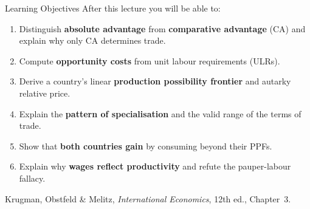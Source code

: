 \documentclass[aspectratio=169]{beamer}
\begin{document}
\begin{frame}{Learning Objectives}
After this lecture you will be able to:
\begin{enumerate}\small
  \item Distinguish \textbf{absolute advantage} from
        \textbf{comparative advantage} (CA) and explain why
        only CA determines trade.
  \item Compute \textbf{opportunity costs} from unit
        labour requirements (ULRs).
  \item Derive a country's linear \textbf{production
        possibility frontier} and autarky relative price.
  \item Explain the \textbf{pattern of specialisation}
        and the valid range of the terms of trade.
  \item Show that \textbf{both countries gain} by
        consuming beyond their PPFs.
  \item Explain why \textbf{wages reflect productivity}
        and refute the pauper-labour fallacy.


\end{enumerate}
\begin{block}{}
\small Krugman, Obstfeld \& Melitz,
\textit{International Economics}, 12th ed., Chapter~3.
\end{block}
\end{frame}

\end{document}

